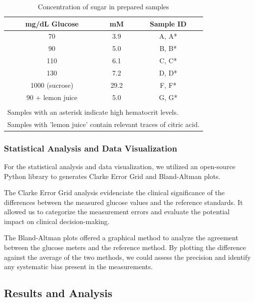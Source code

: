 \documentclass[conference]{IEEEtran}
\begin{document}
\begin{table}[H]
\centering
\caption{Concentration of sugar in prepared samples}
\begin{tabular}{@{}ccc@{}}
\toprule
\textbf{mg/dL Glucose} & \textbf{mM} & \textbf{Sample ID} \\ \midrule
70                     & 3.9         & A, A*              \\
90                     & 5.0         & B, B*              \\
110                    & 6.1         & C, C*              \\
130                    & 7.2         & D, D*              \\
1000 (sucrose)         & 29.2        & F, F*              \\
90 + lemon juice       & 5.0         & G, G*              \\ 
\bottomrule
\\
\multicolumn{3}{l}{\footnotesize *Samples with an asterisk indicate high hematocrit levels.} \\
\multicolumn{3}{l}{\footnotesize *Samples with 'lemon juice' contain relevant traces of citric acid.} \\
\end{tabular}
\label{tab:sugar_concentration}
\end{table}

\subsubsection{Statistical Analysis and Data Visualization}
For the statistical analysis and data visualization, we utilized an open-source Python library \cite{WptmdoornMethcompPython} to generates
 Clarke Error Grid and Bland-Altman plots.

The Clarke Error Grid analysis evidenciate the clinical significance of the differences 
between the measured glucose values and the reference standards. It allowed us to categorize the measurement errors 
and evaluate the potential impact on clinical decision-making.

The Bland-Altman plots offered a graphical method to analyze the agreement between the glucose meters and the reference method.
 By plotting the difference against the average of the two methods, we could assess the precision and identify any systematic bias present in the measurements.   

 \subsection{Results and Analysis}
\end{document}
